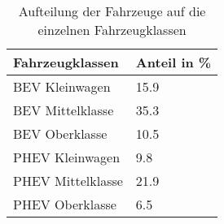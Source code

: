 {
\renewcommand{\arraystretch}{1.2}%
\begin{table}[H]
	\begin{center}
		\caption{Aufteilung der Fahrzeuge auf die einzelnen Fahrzeugklassen}
		\begin{tabu} to 0.7\textwidth {X[1] X[1, r]}
			\hline
			Fahrzeugklassen   & Anteil in \si{\percent}  \\ \hline
			BEV Kleinwagen    & \num{15.9}               \\
			BEV Mittelklasse  & \num{35.3}               \\
			BEV Oberklasse    & \num{10.5}               \\
			PHEV Kleinwagen   & \num{9.8}                \\
			PHEV Mittelklasse & \num{21.9}               \\
			PHEV Oberklasse   & \num{6.5}                \\ \hline
		\end{tabu}
		\label{tab:CarSplit}
	\end{center}
	\vspace{-3mm}%
\end{table}
}